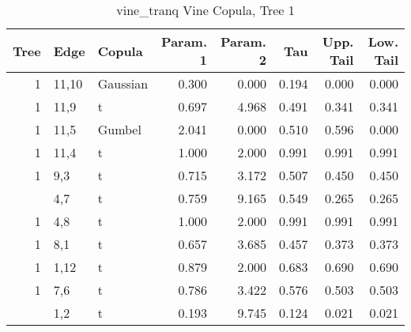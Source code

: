 \begin{table}

\caption{vine_tranq Vine Copula, Tree 1}
\centering
\begin{tabular}[t]{rllrrrrr}
\toprule
Tree & Edge & Copula & Param. 1 & Param. 2 & Tau & Upp. Tail & Low. Tail\\
\midrule
1 & 11,10 & Gaussian & 0.300 & 0.000 & 0.194 & 0.000 & 0.000\\
1 & 11,9 & t & 0.697 & 4.968 & 0.491 & 0.341 & 0.341\\
1 & 11,5 & Gumbel & 2.041 & 0.000 & 0.510 & 0.596 & 0.000\\
1 & 11,4 & t & 1.000 & 2.000 & 0.991 & 0.991 & 0.991\\
1 & 9,3 & t & 0.715 & 3.172 & 0.507 & 0.450 & 0.450\\
\addlinespace
1 & 4,7 & t & 0.759 & 9.165 & 0.549 & 0.265 & 0.265\\
1 & 4,8 & t & 1.000 & 2.000 & 0.991 & 0.991 & 0.991\\
1 & 8,1 & t & 0.657 & 3.685 & 0.457 & 0.373 & 0.373\\
1 & 1,12 & t & 0.879 & 2.000 & 0.683 & 0.690 & 0.690\\
1 & 7,6 & t & 0.786 & 3.422 & 0.576 & 0.503 & 0.503\\
\addlinespace
1 & 1,2 & t & 0.193 & 9.745 & 0.124 & 0.021 & 0.021\\
\bottomrule
\end{tabular}
\end{table}
